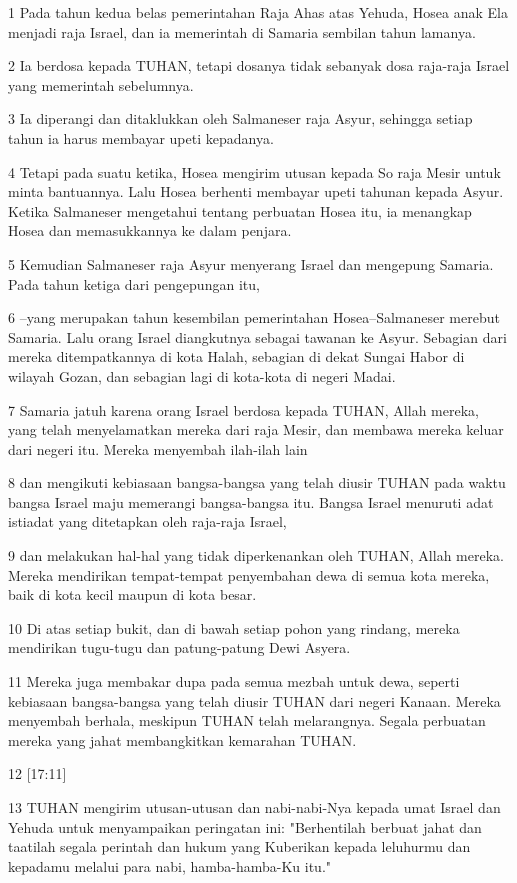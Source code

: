 \par 1 Pada tahun kedua belas pemerintahan Raja Ahas atas Yehuda, Hosea anak Ela menjadi raja Israel, dan ia memerintah di Samaria sembilan tahun lamanya.
\par 2 Ia berdosa kepada TUHAN, tetapi dosanya tidak sebanyak dosa raja-raja Israel yang memerintah sebelumnya.
\par 3 Ia diperangi dan ditaklukkan oleh Salmaneser raja Asyur, sehingga setiap tahun ia harus membayar upeti kepadanya.
\par 4 Tetapi pada suatu ketika, Hosea mengirim utusan kepada So raja Mesir untuk minta bantuannya. Lalu Hosea berhenti membayar upeti tahunan kepada Asyur. Ketika Salmaneser mengetahui tentang perbuatan Hosea itu, ia menangkap Hosea dan memasukkannya ke dalam penjara.
\par 5 Kemudian Salmaneser raja Asyur menyerang Israel dan mengepung Samaria. Pada tahun ketiga dari pengepungan itu,
\par 6 --yang merupakan tahun kesembilan pemerintahan Hosea--Salmaneser merebut Samaria. Lalu orang Israel diangkutnya sebagai tawanan ke Asyur. Sebagian dari mereka ditempatkannya di kota Halah, sebagian di dekat Sungai Habor di wilayah Gozan, dan sebagian lagi di kota-kota di negeri Madai.
\par 7 Samaria jatuh karena orang Israel berdosa kepada TUHAN, Allah mereka, yang telah menyelamatkan mereka dari raja Mesir, dan membawa mereka keluar dari negeri itu. Mereka menyembah ilah-ilah lain
\par 8 dan mengikuti kebiasaan bangsa-bangsa yang telah diusir TUHAN pada waktu bangsa Israel maju memerangi bangsa-bangsa itu. Bangsa Israel menuruti adat istiadat yang ditetapkan oleh raja-raja Israel,
\par 9 dan melakukan hal-hal yang tidak diperkenankan oleh TUHAN, Allah mereka. Mereka mendirikan tempat-tempat penyembahan dewa di semua kota mereka, baik di kota kecil maupun di kota besar.
\par 10 Di atas setiap bukit, dan di bawah setiap pohon yang rindang, mereka mendirikan tugu-tugu dan patung-patung Dewi Asyera.
\par 11 Mereka juga membakar dupa pada semua mezbah untuk dewa, seperti kebiasaan bangsa-bangsa yang telah diusir TUHAN dari negeri Kanaan. Mereka menyembah berhala, meskipun TUHAN telah melarangnya. Segala perbuatan mereka yang jahat membangkitkan kemarahan TUHAN.
\par 12 [17:11]
\par 13 TUHAN mengirim utusan-utusan dan nabi-nabi-Nya kepada umat Israel dan Yehuda untuk menyampaikan peringatan ini: "Berhentilah berbuat jahat dan taatilah segala perintah dan hukum yang Kuberikan kepada leluhurmu dan kepadamu melalui para nabi, hamba-hamba-Ku itu."
